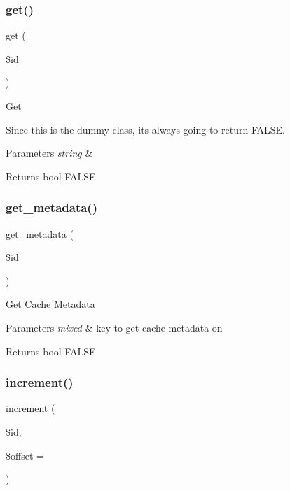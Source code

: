 \subsubsection{\texorpdfstring{get()}{get()}}
{\footnotesize\ttfamily get (\begin{DoxyParamCaption}\item[{}]{\$id }\end{DoxyParamCaption})}

Get

Since this is the dummy class, it\textquotesingle{}s always going to return F\+A\+L\+SE.


\begin{DoxyParams}{Parameters}
{\em string} & \\
\hline
\end{DoxyParams}
\begin{DoxyReturn}{Returns}
bool F\+A\+L\+SE 
\end{DoxyReturn}
\mbox{\label{class_c_i___cache__dummy_a59635cf18e997c5141bffa05ff7622e0}} 
\subsubsection{\texorpdfstring{get\+\_\+metadata()}{get\_metadata()}}
{\footnotesize\ttfamily get\+\_\+metadata (\begin{DoxyParamCaption}\item[{}]{\$id }\end{DoxyParamCaption})}

Get Cache Metadata


\begin{DoxyParams}{Parameters}
{\em mixed} & key to get cache metadata on \\
\hline
\end{DoxyParams}
\begin{DoxyReturn}{Returns}
bool F\+A\+L\+SE 
\end{DoxyReturn}
\mbox{\label{class_c_i___cache__dummy_a2f07a4e09b57f4460d49852497d1808f}} 
\subsubsection{\texorpdfstring{increment()}{increment()}}
{\footnotesize\ttfamily increment (\begin{DoxyParamCaption}\item[{}]{\$id,  }\item[{}]{\$offset = {} }\end{DoxyParamCaption})}

